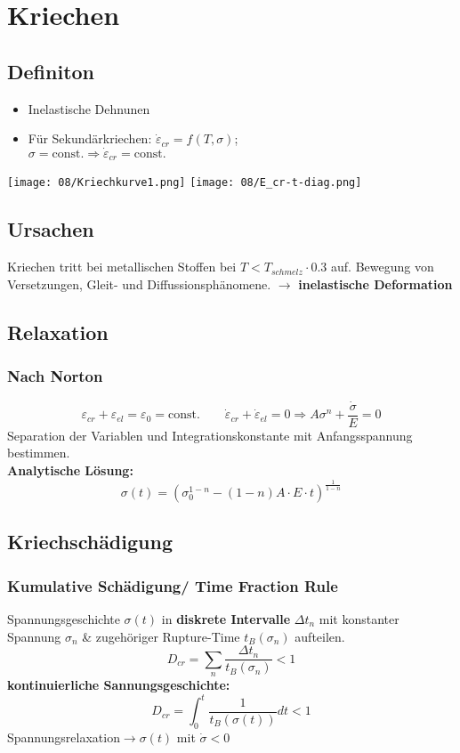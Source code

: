 \section{Kriechen}
    \subsection{Definiton}
        \begin{itemize}
            \item Inelastische Dehnunen
            \item Für Sekundärkriechen: $\dot{\varepsilon}_{cr} = f(T,\sigma)$;\\$\sigma = \textrm{const.} \Rightarrow \dot{\varepsilon}_{cr}= \textrm{const.}$
        \end{itemize}
        \texttt{[image: 08/Kriechkurve1.png]}
        \texttt{[image: 08/E\_cr-t-diag.png]}
    \subsection{Ursachen}
        Kriechen tritt bei metallischen Stoffen bei $ T < T_{schmelz} \cdot 0.3  $ auf.
        Bewegung von Versetzungen, Gleit- und Diffussionsphänomene. $\rightarrow$ \textbf{inelastische Deformation}
        
    \subsection{Relaxation}
        \subsubsection{Nach Norton}
            \[\varepsilon_{cr}+\varepsilon_{el}=\varepsilon_0=\textrm{const.} \qquad \dot{\varepsilon}_{cr}+\dot{\varepsilon}_{el}=0 \Rightarrow A\sigma^n + \frac{\dot{\sigma}}{E}=0\]
            Separation der Variablen und Integrationskonstante mit Anfangsspannung bestimmen.
            \\\textbf{Analytische Lösung:}
            \vspace{-2mm}\[\sigma(t)=\left(\sigma_{0}^{1-n}-(1-n)A\cdot E\cdot t\right)^{\frac{1}{1-n}}\]
\columnbreak
    \subsection{Kriechschädigung}
        \subsubsection{Kumulative Schädigung/ Time Fraction Rule}
            Spannungsgeschichte $\sigma(t)$ in \textbf{diskrete Intervalle} $\Delta t_n$ mit konstanter Spannung $\sigma_n$ \& zugehöriger Rupture-Time $t_B(\sigma_n)$ aufteilen.
            \vspace{-2mm}\[D_{cr}=\sum_n\frac{\Delta t_{n}}{t_B(\sigma_n)} < 1\]
            \textbf{kontinuierliche Sannungsgeschichte:}
            \vspace{-2mm}\[D_{cr}=\int_0^t\frac{1}{t_B(\sigma(t))}dt < 1\]
            Spannungsrelaxation$\rightarrow \sigma(t)$ mit $\dot{\sigma}<0$
